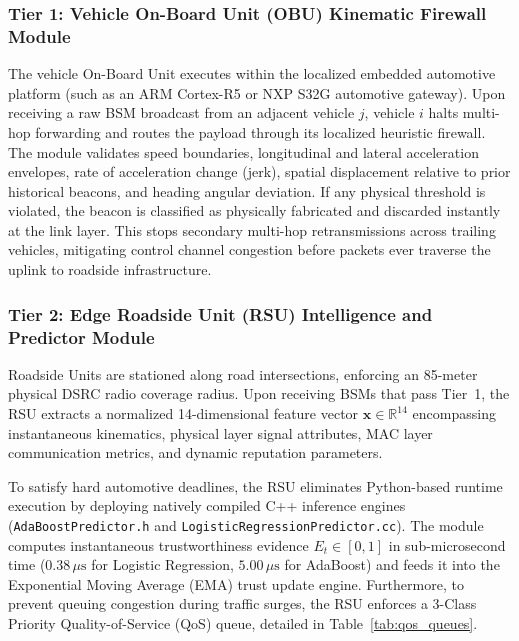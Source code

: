 \documentclass[conference]{IEEEtran}
\begin{document}
\subsubsection{Tier 1: Vehicle On-Board Unit (OBU) Kinematic Firewall Module}
The vehicle On-Board Unit executes within the localized embedded automotive platform (such as an ARM Cortex-R5 or NXP S32G automotive gateway). Upon receiving a raw BSM broadcast from an adjacent vehicle $j$, vehicle $i$ halts multi-hop forwarding and routes the payload through its localized heuristic firewall. The module validates speed boundaries, longitudinal and lateral acceleration envelopes, rate of acceleration change (jerk), spatial displacement relative to prior historical beacons, and heading angular deviation. If any physical threshold is violated, the beacon is classified as physically fabricated and discarded instantly at the link layer. This stops secondary multi-hop retransmissions across trailing vehicles, mitigating control channel congestion before packets ever traverse the uplink to roadside infrastructure.

\subsubsection{Tier 2: Edge Roadside Unit (RSU) Intelligence and Predictor Module}
Roadside Units are stationed along road intersections, enforcing an 85-meter physical DSRC radio coverage radius. Upon receiving BSMs that pass Tier~1, the RSU extracts a normalized 14-dimensional feature vector $\mathbf{x} \in \mathbb{R}^{14}$ encompassing instantaneous kinematics, physical layer signal attributes, MAC layer communication metrics, and dynamic reputation parameters. 

To satisfy hard automotive deadlines, the RSU eliminates Python-based runtime execution by deploying natively compiled C++ inference engines (\texttt{AdaBoostPredictor.h} and \texttt{LogisticRegressionPredictor.cc}). The module computes instantaneous trustworthiness evidence $E_t \in [0, 1]$ in sub-microsecond time ($0.38\,\mu\text{s}$ for Logistic Regression, $5.00\,\mu\text{s}$ for AdaBoost) and feeds it into the Exponential Moving Average (EMA) trust update engine. Furthermore, to prevent queuing congestion during traffic surges, the RSU enforces a 3-Class Priority Quality-of-Service (QoS) queue, detailed in Table~\ref{tab:qos_queues}.
\end{document}
